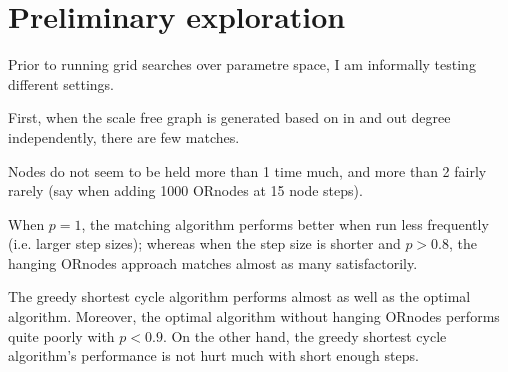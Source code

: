\documentclass[main.tex]{subfiles}
\begin{document}
\section{Preliminary exploration}
Prior to running grid searches over parametre space, I am informally testing different settings.

First, when the scale free graph is generated based on in and out degree independently, there are few matches.

Nodes do not seem to be held more than 1 time much, and more than 2 fairly rarely (say when adding 1000 ORnodes at 15 node steps).

When $p=1$, the matching algorithm performs better when run less frequently (i.e. larger step sizes); whereas when the step size is shorter and $p > 0.8$, the hanging ORnodes approach matches almost as many satisfactorily.

The greedy shortest cycle algorithm performs almost as well as the optimal algorithm. Moreover, the optimal algorithm without hanging ORnodes performs quite poorly with $p < 0.9$. On the other hand, the greedy shortest cycle algorithm's performance is not hurt much with short enough steps.
\end{document}
